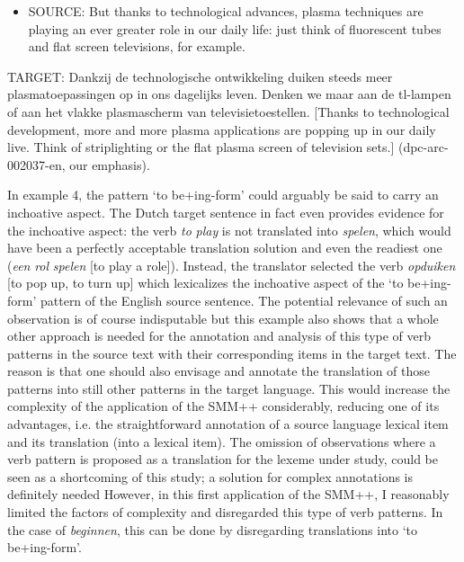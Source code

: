 \begin{itemize}
\item \begin{styleVoorbeeld}
SOURCE: But thanks to technological advances, plasma techniques are playing an ever greater role in our daily life: just think of fluorescent tubes and flat screen televisions, for example.
\end{styleVoorbeeld}\end{itemize}

TARGET: Dankzij de technologische ontwikkeling duiken steeds meer plasmatoepassingen op in ons dagelijks leven. Denken we maar aan de tl-lampen of aan het vlakke plasmascherm van televisietoestellen. [Thanks to technological development, more and more plasma applications are popping up in our daily live. Think of striplighting or the flat plasma screen of television sets.] (dpc-arc-002037-en, our emphasis).



In example 4, the pattern ‘to be+ing-form’ could arguably be said to carry an inchoative aspect. The Dutch target sentence in fact even provides evidence for the inchoative aspect: the verb \textit{to} \textit{play} is not translated into \textit{spelen}, which would have been a perfectly acceptable translation solution and even the readiest one (\textit{een} \textit{rol} \textit{spelen} [to play a role]). Instead, the translator selected the verb \textit{opduiken} [to pop up, to turn up] which lexicalizes the inchoative aspect of the ‘to be+ing-form’ pattern of the English source sentence. The potential relevance of such an observation is of course indisputable but this example also shows that a whole other approach is needed for the annotation and analysis of this type of verb patterns in the source text with their corresponding items in the target text. The reason is that one should also envisage and annotate the translation of those patterns into still other patterns in the target language. This would increase the complexity of the application of the SMM++ considerably, reducing one of its advantages, i.e. the straightforward annotation of a source language lexical item and its translation (into a lexical item). The omission of observations where a verb pattern is proposed as a translation for the lexeme under study, could be seen as a shortcoming of this study; a solution for complex annotations is definitely needed However, in this first application of the SMM++, I reasonably limited the factors of complexity and disregarded this type of verb patterns. In the case of \textit{beginnen}, this can be done by disregarding translations into ‘to be+ing-form’.



